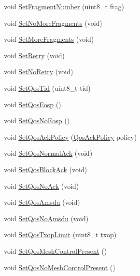 \begin{DoxyCompactItemize}
\item 
void \hyperlink{classns3_1_1WifiMacHeader_ad11306bd3a2edf81346a14a9c4fe7388}{Set\+Fragment\+Number} (uint8\+\_\+t frag)
\item 
void \hyperlink{classns3_1_1WifiMacHeader_a3898df5358df4247926b74175f2789c3}{Set\+No\+More\+Fragments} (void)
\item 
void \hyperlink{classns3_1_1WifiMacHeader_abf2c196274eaa8ae637cab1730fe9e8a}{Set\+More\+Fragments} (void)
\item 
void \hyperlink{classns3_1_1WifiMacHeader_a885db0be16b199a3e40388c0a70f2f99}{Set\+Retry} (void)
\item 
void \hyperlink{classns3_1_1WifiMacHeader_a2dbe5e569e783f6d975c13daf3015f12}{Set\+No\+Retry} (void)
\item 
void \hyperlink{classns3_1_1WifiMacHeader_a84a98932f5b66cca86bdfaa9cb1bcf7b}{Set\+Qos\+Tid} (uint8\+\_\+t tid)
\item 
void \hyperlink{classns3_1_1WifiMacHeader_ac6c11bec825f0f785e5d9df645e80b23}{Set\+Qos\+Eosp} ()
\item 
void \hyperlink{classns3_1_1WifiMacHeader_a911b989fc89a91b53bfb12b9005eeb09}{Set\+Qos\+No\+Eosp} ()
\item 
void \hyperlink{classns3_1_1WifiMacHeader_a0f884f7997eaf10238ad3c2367332e82}{Set\+Qos\+Ack\+Policy} (\hyperlink{classns3_1_1WifiMacHeader_ae3a382482f357972019f5e1b3162adc4}{Qos\+Ack\+Policy} policy)
\item 
void \hyperlink{classns3_1_1WifiMacHeader_afb131e2f8897b27f5dbf9c38d9648b16}{Set\+Qos\+Normal\+Ack} (void)
\item 
void \hyperlink{classns3_1_1WifiMacHeader_a722ee096ce3257c0f2fbc168a3258bb2}{Set\+Qos\+Block\+Ack} (void)
\item 
void \hyperlink{classns3_1_1WifiMacHeader_ad4ff66047161d30310e50bf230ce2d62}{Set\+Qos\+No\+Ack} (void)
\item 
void \hyperlink{classns3_1_1WifiMacHeader_a26c1f793b7cc33ba615c5766022fce00}{Set\+Qos\+Amsdu} (void)
\item 
void \hyperlink{classns3_1_1WifiMacHeader_ab2ebe7fcf213a774655f0a32e529bf4e}{Set\+Qos\+No\+Amsdu} (void)
\item 
void \hyperlink{classns3_1_1WifiMacHeader_a3fd739ae35e6a8deb3b14f81f81e9b36}{Set\+Qos\+Txop\+Limit} (uint8\+\_\+t txop)
\item 
void \hyperlink{classns3_1_1WifiMacHeader_ad2eac5d6e09a5e09bf0350e35c614166}{Set\+Qos\+Mesh\+Control\+Present} ()
\item 
void \hyperlink{classns3_1_1WifiMacHeader_aaaf3810b387f3f7c62e837ddf8174b9f}{Set\+Qos\+No\+Mesh\+Control\+Present} ()

\end{DoxyCompactItemize}
